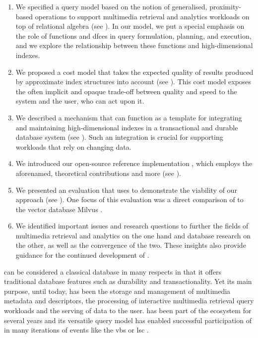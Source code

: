 \begin{enumerate}
    \item We specified a query model based on the notion of generalised, proximity-based operations to support multimedia retrieval and analytics workloads on top of relational algebra (see ). In our model, we put a special emphasis on the role of functions and \acrlong{dfc}es in query formulation, planning, and execution, and we explore the relationship between these functions and high-dimensional indexes.
    \item We proposed a cost model that takes the expected quality of results produced by approximate index structures into account (see ). This cost model exposes the often implicit and opaque trade-off between quality and speed to the system and the user, who can act upon it.
    \item We described a mechanism that can function as a template for integrating and maintaining high-dimensional indexes in a transactional and durable database system (see ). Such an integration is crucial for supporting workloads that rely on changing data.
    \item We introduced our open-source reference implementation \cottontail{}, which employs the aforenamed, theoretical contributions and more (see ). 
    \item We presented an evaluation that uses \cottontail{} to demonstrate the viability of our approach (see ). One focus of this evaluation was a direct comparison of \cottontail{} to the vector database Milvus \cite{Wang:2021Milvus}.
    \item We identified important issues and research questions to further the fields of multimedia retrieval and analytics on the one hand and database research on the other, as well as the convergence of the two. These insights also provide guidance for the continued development of \cottontail{}.
\end{enumerate}

\cottontail{} can be considered a classical database in many respects in that it offers traditional database features such as durability and transactionality. Yet its main purpose, until today, has been the storage and management of multimedia metadata and descriptors, the processing of interactive multimedia retrieval query workloads and the serving of data to the user. \cottontail{} has been part of the \vitrivr{} ecosystem \cite{Rossetto:2016Vitrivr,Gasser:2019Multimodal} for several years and its versatile query model has enabled successful participation of \vitrivr{} in many iterations of events like the \acrshort{vbs} \cite{Rossetto:2019Deep,Sauter:2020Combining,Spiess:2021Competitive,Heller:2022Multi} or \acrshort{lsc} \cite{Spiess:2021Exploring,Heller:2020Interactive,Heller:2021Interactive,Spiess:2022Multi}.

